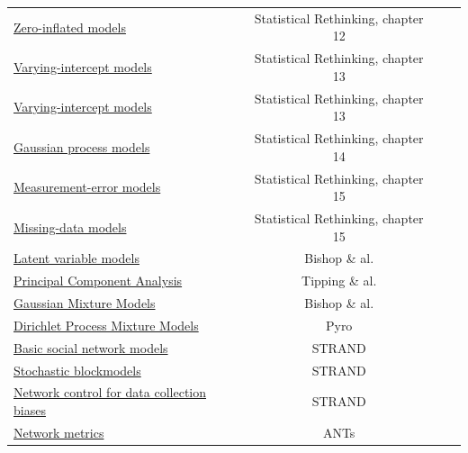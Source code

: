 \documentclass[blind,lineno,num-refs]{wiley-article}
\begin{document}
\begin{table}[bt]
\begin{threeparttable}
\begin{tabular}{lccc}
\href{https://tinyurl.com/9cbn8fjb}{Zero-inflated models}
& Statistical Rethinking, chapter 12 \citep{rethinking} \\

\href{https://tinyurl.com/ycy8ed3n}{Varying-intercept models}
& Statistical Rethinking, chapter 13 \citep{rethinking} \\

\href{https://tinyurl.com/3nejcbbz}{Varying-intercept models}
& Statistical Rethinking, chapter 13 \citep{rethinking} \\

\href{https://tinyurl.com/ysnms3t6}{Gaussian process models}
& Statistical Rethinking, chapter 14 \citep{rethinking} \\

\href{https://tinyurl.com/3jhbszv3}{Measurement-error models}
& Statistical Rethinking, chapter 15 \citep{rethinking} \\

\href{https://tinyurl.com/4wzc8m3w}{Missing-data models}
& Statistical Rethinking, chapter 15 \citep{rethinking} \\

\href{https://tinyurl.com/4daz4s5b}{Latent variable models}
& Bishop \& al. \citep{bishop1998latent} \\

\href{https://tinyurl.com/mrpcjjhd}{Principal Component Analysis}
& Tipping \& al. \citep{tipping1999probabilistic} \\

\href{https://tinyurl.com/ys342rve}{Gaussian Mixture Models}
& Bishop \& al. \citep{bishop2006pattern} \\

\href{https://tinyurl.com/374undnp}{Dirichlet Process Mixture Models}
& Pyro \citep{bingham2019pyro} \\

\href{https://tinyurl.com/3nrzkrjk}{Basic social network models}
& STRAND \citep{STRAND1} \\

\href{https://tinyurl.com/5t57zh7f}{Stochastic blockmodels}
& STRAND \citep{STRAND1} \\

\href{https://tinyurl.com/2cnfhtzr}{Network control for data collection biases}
& STRAND \citep{STRAND2025} \\

\href{https://tinyurl.com/8zpct5r9}{Network metrics} &
ANTs \citep{sosa2020multilevel,sosa2021network} \\


\end{tabular}
\end{threeparttable}
\end{table}
\end{document}
